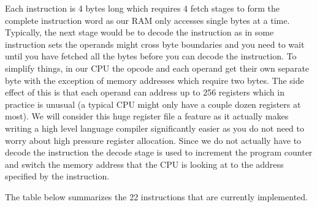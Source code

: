 \documentclass[10pt]{article}
\begin{document}
        Each instruction is 4 bytes long which requires 4 fetch stages
        to form the complete instruction word as our RAM only accesses
        single bytes at a time.  Typically, the next stage would be to
        decode the instruction as in some instruction sets the operands
        might cross byte boundaries and you need to wait until you have
        fetched all the bytes before you can decode the instruction. To
        simplify things, in our CPU the opcode and each operand get
        their own separate byte with the exception of memory addresses
        which require two bytes.  The side effect of this is that each
        operand can address up to 256 registers which in practice is
        unusual (a typical CPU might only have a couple dozen registers
        at most). We will consider this huge register file a feature as
        it actually makes writing a high level language compiler
        significantly easier as you do not need to worry about high
        pressure register allocation.  Since we do not actually have to
        decode the instruction the decode stage is used to increment
        the program counter and switch the memory address that the CPU
        is looking at to the address specified by the instruction.

        \vspace{\baselineskip}
        The table below summarizes the 22 instructions that are currently
        implemented.
\end{document}
